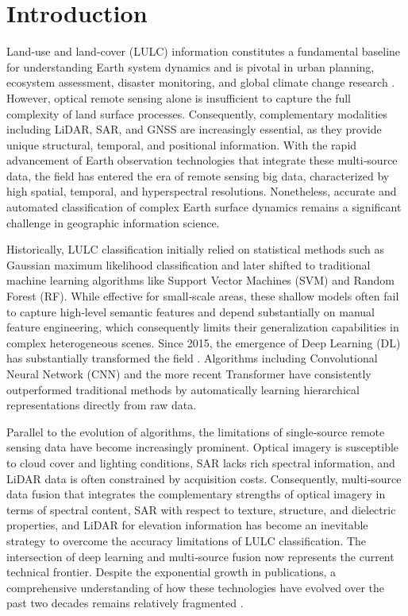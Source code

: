 \documentclass[]{interact}
\theoremstyle{plain}%
\theoremstyle{definition}
\theoremstyle{remark}
\begin{document}
\section{Introduction}

Land‑use and land‑cover (LULC) information constitutes a fundamental baseline for understanding Earth system dynamics and is pivotal in urban planning, ecosystem assessment, disaster monitoring, and global climate change research \citep{1}. However, optical remote sensing alone is insufficient to capture the full complexity of land surface processes. Consequently, complementary modalities including LiDAR, SAR, and GNSS are increasingly essential, as they provide unique structural, temporal, and positional information. With the rapid advancement of Earth observation technologies that integrate these multi‑source data, the field has entered the era of remote sensing big data, characterized by high spatial, temporal, and hyperspectral resolutions. Nonetheless, accurate and automated classification of complex Earth surface dynamics remains a significant challenge in geographic information science.


Historically, LULC classification initially relied on statistical methods such as Gaussian maximum likelihood classification and later shifted to traditional machine learning algorithms like Support Vector Machines (SVM) and Random Forest (RF). While effective for small‑scale areas, these shallow models often fail to capture high‑level semantic features and depend substantially on manual feature engineering, which consequently limits their generalization capabilities in complex heterogeneous scenes. Since 2015, the emergence of Deep Learning (DL) has substantially transformed the field \citep{2}. Algorithms including Convolutional Neural Network (CNN) and the more recent Transformer have consistently outperformed traditional methods by automatically learning hierarchical representations directly from raw data.



Parallel to the evolution of algorithms, the limitations of single‑source remote sensing data have become increasingly prominent. Optical imagery is susceptible to cloud cover and lighting conditions, SAR lacks rich spectral information, and LiDAR data is often constrained by acquisition costs. Consequently, multi‑source data fusion that integrates the complementary strengths of optical imagery in terms of spectral content, SAR with respect to texture, structure, and dielectric properties, and LiDAR for elevation information has become an inevitable strategy to overcome the accuracy limitations of LULC classification. The intersection of deep learning and multi‑source fusion now represents the current technical frontier. Despite the exponential growth in publications, a comprehensive understanding of how these technologies have evolved over the past two decades remains relatively fragmented \citep{5}.
\end{document}
